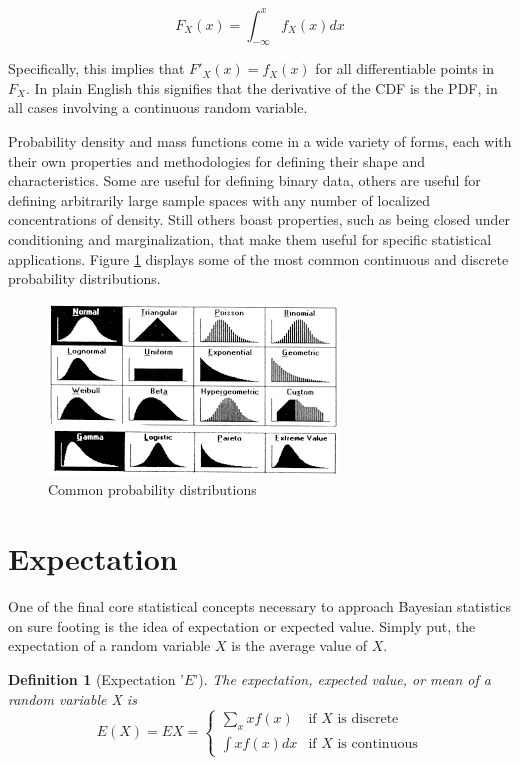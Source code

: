 \documentclass[
  12pt,
]{book}
\theoremstyle{definition}
\newtheorem{definition}{Definition}[chapter]
\theoremstyle{definition}
\theoremstyle{definition}
\theoremstyle{remark}
\begin{document}
\[F_X(x)=\int_{-\infty}^{x}f_X(x)dx\]

Specifically, this implies that \(F'_X(x)=f_X(x)\) for all differentiable points in \(F_X\).
In plain English this signifies that the derivative of the CDF is the PDF, in all cases involving a continuous random variable.

Probability density and mass functions come in a wide variety of forms, each with their own properties and methodologies for defining their shape and characteristics.
Some are useful for defining binary data, others are useful for defining arbitrarily large sample spaces with any number of localized concentrations of density.
Still others boast properties, such as being closed under conditioning and marginalization, that make them useful for specific statistical applications.
Figure \ref{fig:distributions} displays some of the most common continuous and discrete probability distributions.

\begin{figure}

{\centering \includegraphics[width=0.7\linewidth]{./images/distributions} 

}

\caption{Common probability distributions}\label{fig:distributions}
\end{figure}

\hypertarget{expectation}{%
\section{Expectation}\label{expectation}}

One of the final core statistical concepts necessary to approach Bayesian statistics on sure footing is the idea of expectation or expected value.
Simply put, the expectation of a random variable \(X\) is the average value of \(X\).

\begin{definition}[Expectation '$E$']
\protect\hypertarget{def:e}{}{\label{def:e} {} }\emph{The expectation, expected value, or mean of a random variable X is}
\[E(X)=EX=\begin{cases}\sum_{x}xf(x) & \textrm{if }X\textrm{ is discrete}\\\int{xf(x)dx} & \textrm{if }X\textrm{ is continuous}\end{cases}\]
\end{definition}
\end{document}
